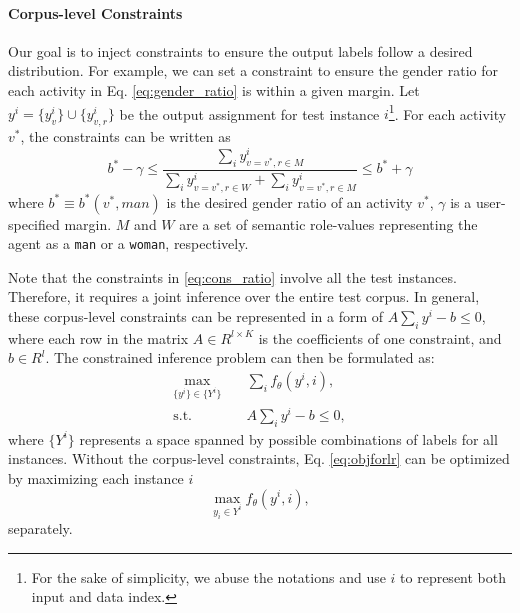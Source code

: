 



\paragraph{Corpus-level Constraints}
Our goal is to inject constraints to ensure the output labels follow a desired distribution. For example, we can set a constraint to ensure the gender ratio for each activity in Eq. \eqref{eq:gender_ratio} is within a given margin. 
Let $y^i = \{y^i_v\} \cup \{y^i_{v,r}\}$ be the output assignment for test instance $i$\footnote{For the sake of simplicity, we abuse the notations and use $i$ to represent both input and data index.}.
For each activity $v^*$, the constraints can be written as 
\begin{equation}\label{eq:cons_ratio} 
 b^* \!-\! \gamma \!\leq\! \frac{\sum_i y^i_{v = v^*, r \in M}}{\sum_i y^i_{v = v^*, r \in W} \!+\! \sum_i y^i_{v = v^*, r \in M}} \!\leq\! b^* + \gamma
\end{equation}
where $b^* \equiv b^*(v^*, man)$ is the desired gender ratio of an activity $v^*$, $\gamma$ is a user-specified margin. $M$ and $W$ are a set of semantic role-values representing the agent as a \texttt{man} or a \texttt{woman}, respectively. 

Note that the constraints in \eqref{eq:cons_ratio} involve all the test instances.
Therefore, it requires a joint inference over the entire test corpus.
In general, these corpus-level constraints can be represented in a form of $A\sum_i y^i - b \leq 0$, where each row in the matrix $A\in R^{l \times K}$ is the coefficients of one constraint, and $b\in R^l$.
The constrained inference problem can then be formulated as:
\begin{equation}
\begin{split}
\label{eq:objforlr}
    \max_{\{y^i\}\in \{Y^i\}} \quad& \sum_i {f_\theta(y^i, i)}, \\
      \text{s.t. } \quad& 
    A\sum_i y^i - b \leq 0,
\end{split}
\end{equation}
where $\{Y^i\}$ represents a  space spanned by possible combinations of labels for all instances. Without the corpus-level constraints, Eq. \eqref{eq:objforlr} can be optimized by maximizing each instance $i$ $$\max_{y_i\in Y^i} f_\theta (y^i, i),$$ separately. 

